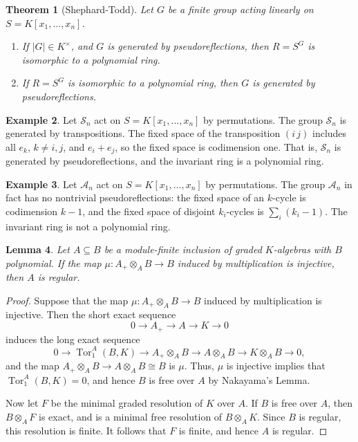 \documentclass[12pt]{amsart}
\newtheorem{theorem}{Theorem}[section]
\newtheorem{lemma}[theorem]{Lemma}
\theoremstyle{definition}
\newtheorem{example}[theorem]{Example}
\numberwithin{equation}{theorem}
\def\Tor{\operatorname{Tor}}
\def\to{\longrightarrow}
\begin{document}
\begin{theorem}[Shephard-Todd] Let $G$ be a finite group acting linearly on $S=K[x_1,\dots,x_n]$.
\begin{enumerate}
\item If $|G|\in K^\times$, and $G$ is generated by pseudoreflections, then $R=S^G$ is isomorphic to a polynomial ring.
\item If $R=S^G$ is isomorphic to a polynomial ring, then $G$ is generated by pseudoreflections.
\end{enumerate}
\end{theorem}


\begin{example}
Let $\mathcal{S}_n$ act on $S=K[x_1,\dots,x_n]$ by permutations. The group $\mathcal{S}_n$ is generated by transpositions. The fixed space of the transposition $(i\, j)$ includes all $e_k$, $k\neq i,j$, and $e_i + e_j$, so the fixed space is codimension one. That is, $\mathcal{S}_n$ is generated by pseudoreflections, and the invariant ring is a polynomial ring.
\end{example}

\begin{example}
Let $\mathcal{A}_n$ act on $S=K[x_1,\dots,x_n]$ by permutations. The group $\mathcal{A}_n$ in fact has no nontrivial pseudoreflections: the fixed space of an $k$-cycle is codimension $k-1$, and the fixed space of disjoint $k_i$-cycles is $\sum_i (k_i -1)$.
The invariant ring is not a polynomial ring.
\end{example}


\begin{lemma} Let $A\subseteq B$ be a module-finite inclusion of graded $K$-algebras with $B$ polynomial. If the map $\mu: A_+ \otimes_A B \to B$ induced by multiplication is injective, then $A$ is regular.
\end{lemma}
\begin{proof}
Suppose that the map $\mu: A_+ \otimes_A B \to B$ induced by multiplication is injective. Then the short exact sequence
\[ 0 \to A_+ \to A \to K \to 0\]
induces the long exact sequence
\[ 0 \to \Tor^A_1(B,K) \to A_+ \otimes_A B \to A \otimes_A B \to K \otimes_A B \to 0,\]
and the map $A_+ \otimes_A B \to A \otimes_A B\cong B$ is $\mu$. Thus, $\mu$ is injective implies that $\Tor^A_1(B,K)=0$, and hence $B$ is free over $A$ by Nakayama's Lemma.

Now let $F$ be the minimal graded resolution of $K$ over $A$. If $B$ is free over $A$, then $B\otimes_A F$ is exact, and is a minimal free resolution of $B\otimes_A K$. Since $B$ is regular, this resolution is finite. It follows that $F$ is finite, and hence $A$ is regular.
\end{proof}
\end{document}
